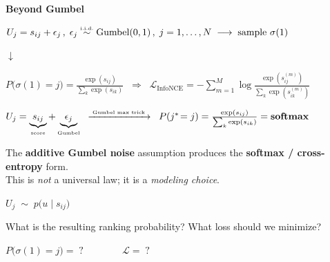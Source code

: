 \documentclass[aspectratio=169,10pt]{beamer}
\begin{document}
\begin{frame}[plain]{\textbf{Beyond Gumbel}}
\footnotesize
\begin{tcolorbox}[colback=violet!4, colframe=violet!50, boxrule=1pt, arc=4pt,
    left=4pt, right=4pt, top=2pt, bottom=2pt,
    title={\centering\scriptsize\sffamily\bfseries How the sampling model determines the loss},
    coltitle=white, colbacktitle=violet!45, fonttitle=\sffamily\scriptsize\bfseries]
\centering
$
U_j = s_{ij} + \epsilon_j
\,,\;
\epsilon_j \overset{\text{\tiny i.i.d.}}{\sim} \text{Gumbel}(0,1)
\,,\;
j = 1,\ldots,N
\;\longrightarrow\;
\text{sample } \sigma(1)
$

\vspace{2pt}
{\tiny\color{violet!40}$\downarrow$}
\vspace{2pt}

$
P\bigl(\sigma(1) {=} j\bigr) =
\frac{\exp(s_{ij})}{\sum_{k} \exp(s_{ik})}
\;\;\Rightarrow\;\;
\mathcal{L}_{\text{InfoNCE}} = -\textstyle\sum_{m=1}^{M} \log
\frac{\exp(s_{ij}^{(m)})}{\sum_{k} \exp(s_{ik}^{(m)})}
$
\end{tcolorbox}

\vspace{2pt}
\begin{tcolorbox}[colback=red!4, colframe=red!45, boxrule=1pt, arc=4pt,
    left=4pt, right=4pt, top=3pt, bottom=3pt]
\centering
$
U_j = \underbrace{s_{ij}}_{\text{\tiny score}} + \underbrace{\epsilon_j}_{\text{\tiny Gumbel}}
\;\;
\xrightarrow{\;\text{\tiny Gumbel max trick}\;}
\;\;
P(j^* \!= j) = \frac{\exp(s_{ij})}{\sum_k \exp(s_{ik})}
= \textbf{softmax}
$

\vspace{3pt}

{\scriptsize The \textbf{additive Gumbel noise} assumption produces the \textbf{softmax / cross-entropy} form.\\[0pt]
This is \emph{not} a universal law; it is a \emph{modeling choice}.}
\end{tcolorbox}

\vspace{2pt}
\begin{tcolorbox}[colback=blue!4, colframe=blue!45, boxrule=1pt, arc=4pt,
    left=4pt, right=4pt, top=3pt, bottom=3pt,
    title={\centering\scriptsize\sffamily\bfseries What happens in the general case?},
    coltitle=white, colbacktitle=blue!45, fonttitle=\sffamily\scriptsize\bfseries]
\centering
$
U_j \;\sim\; p\bigl(u \mid s_{ij}\bigr)
$

\vspace{2pt}

{\scriptsize What is the resulting ranking probability? \; What loss should we minimize?}

\vspace{1pt}

$
P\bigl(\sigma(1) {=} j\bigr) = \;?
\qquad\qquad
\mathcal{L} = \;?
$
\end{tcolorbox}
\end{frame}
\end{document}
